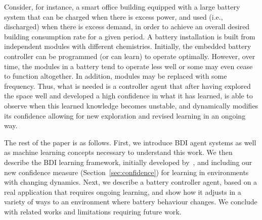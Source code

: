 Consider, for instance, a smart office building equipped with a large battery system that can be charged when there is excess power, and used (i.e., discharged) when there is excess demand, in order to achieve an overall desired building consumption rate for a given period. A battery installation is built from independent modules with different chemistries. Initially, the embedded battery controller can be programmed (or can learn) to operate optimally. However, over time, the modules in a battery tend to operate less well or some may even cease to function altogether. In addition, modules may be replaced with some frequency.  
Thus, what is needed is a controller agent that after having explored the space well and developed a high confidence in what it has learned, is able to observe when this learned knowledge becomes unstable, and dynamically modifies its confidence allowing for new exploration and revised learning
in an ongoing way.

The rest of the paper is as follows.
%
First, we introduce BDI agent systems as well as machine learning concepts necessary to understand this work. 
%
We then describe the BDI learning framework, initially developed by~\cite{airiau09:enhancing,singh10:extending,singh10:learning}, and including our new confidence measure (Section~\ref{sec:confidence}) for learning in environments with changing dynamics. 
%
Next, we describe a battery controller agent, based on a real application that requires ongoing learning, and show how it adjusts in a variety of ways to an environment where battery behaviour changes. 
%
We conclude with related works and limitations requiring future work.




